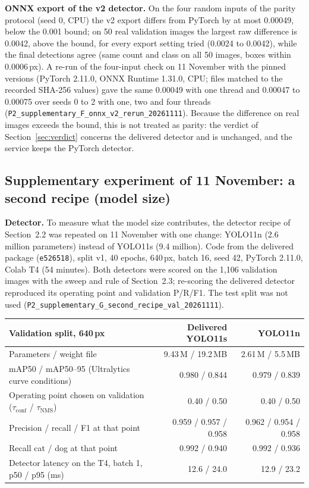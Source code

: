 \documentclass[11pt,a4paper]{article}
\newcommand{\tconf}{$\tau_{\text{conf}}$}
\newcommand{\tnms}{$\tau_{\text{NMS}}$}
\newcommand{\ev}[1]{\nolinkurl{#1}}
\begin{document}
\textbf{ONNX export of the v2 detector.} On the four random inputs of the parity protocol (seed 0, CPU) the v2 export differs from PyTorch by at most 0.00049, below the 0.001 bound; on 50 real validation images the largest raw difference is 0.0042, above the bound, for every export setting tried (0.0024 to 0.0042), while the final detections agree (same count and class on all 50 images, boxes within 0.0006\,px). A re-run of the four-input check on 11 November with the pinned versions (PyTorch 2.11.0, ONNX Runtime 1.31.0, CPU; files matched to the recorded SHA-256 values) gave the same 0.00049 with one thread and 0.00047 to 0.00075 over seeds 0 to 2 with one, two and four threads (\ev{P2_supplementary_F_onnx_v2_rerun_20261111}). Because the difference on real images exceeds the bound, this is not treated as parity: the verdict of Section~\ref{sec:verdict} concerns the delivered detector and is unchanged, and the service keeps the PyTorch detector.

\subsection{Supplementary experiment of 11 November: a second recipe (model size)}\label{sec:suppg}

\textbf{Detector.} To measure what the model size contributes, the detector recipe of Section~2.2 was repeated on 11 November with one change: YOLO11n (2.6 million parameters) instead of YOLO11s (9.4 million). Code from the delivered package (\texttt{e526518}), split v1, 40 epochs, 640\,px, batch 16, seed 42, PyTorch 2.11.0, Colab T4 (54 minutes). Both detectors were scored on the 1,106 validation images with the sweep and rule of Section~2.3; re-scoring the delivered detector reproduced its operating point and validation P/R/F1. The test split was not used (\ev{P2_supplementary_G_second_recipe_val_20261111}).

\begin{tabularx}{\linewidth}{@{}Y r r@{}}
\toprule
Validation split, 640\,px & Delivered YOLO11s & YOLO11n \\
\midrule
Parameters / weight file & 9.43\,M / 19.2\,MB & 2.61\,M / 5.5\,MB \\
mAP50 / mAP50--95 (Ultralytics curve conditions) & 0.980 / 0.844 & 0.979 / 0.839 \\
Operating point chosen on validation (\tconf{} / \tnms{}) & 0.40 / 0.50 & 0.40 / 0.50 \\
Precision / recall / F1 at that point & 0.959 / 0.957 / 0.958 & 0.962 / 0.954 / 0.958 \\
Recall cat / dog at that point & 0.992 / 0.940 & 0.992 / 0.936 \\
Detector latency on the T4, batch 1, p50 / p95 (ms) & 12.6 / 24.0 & 12.9 / 23.2 \\
\bottomrule
\end{tabularx}
\end{document}
